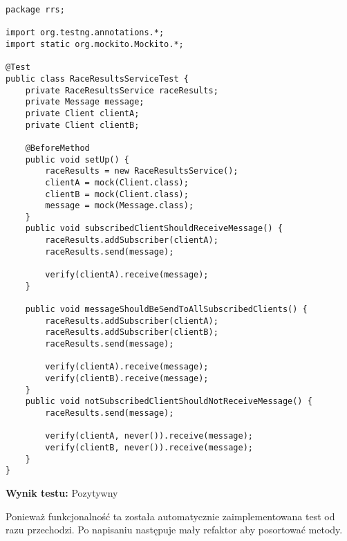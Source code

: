 \documentclass[a4paper,12pt,twoside]{article}
\begin{document}
\begin{lstlisting}
package rrs;

import org.testng.annotations.*;
import static org.mockito.Mockito.*;

@Test
public class RaceResultsServiceTest {
    private RaceResultsService raceResults;
    private Message message;
    private Client clientA;
    private Client clientB;
    
    @BeforeMethod
    public void setUp() {
        raceResults = new RaceResultsService();
        clientA = mock(Client.class);
        clientB = mock(Client.class);
        message = mock(Message.class);
    }
    public void subscribedClientShouldReceiveMessage() {
        raceResults.addSubscriber(clientA);
        raceResults.send(message);
        
        verify(clientA).receive(message);
    }
    
    public void messageShouldBeSendToAllSubscribedClients() {
        raceResults.addSubscriber(clientA);
        raceResults.addSubscriber(clientB);
        raceResults.send(message);
        
        verify(clientA).receive(message);
        verify(clientB).receive(message);
    }
    public void notSubscribedClientShouldNotReceiveMessage() {
        raceResults.send(message);
        
        verify(clientA, never()).receive(message);
        verify(clientB, never()).receive(message);
    }
}
\end{lstlisting}

\noindent
\textbf{Wynik testu: }{\color{green} Pozytywny}

Ponieważ funkcjonalność ta została automatycznie zaimplementowana test od razu przechodzi.
Po napisaniu następuje mały refaktor aby posortować metody.
\end{document}
